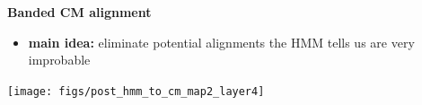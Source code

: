 \documentclass[landscape]{slides}
\begin{document}
\begin{slide}
\begin{center}
\large
\textbf{Banded CM alignment}
\end{center}
\medskip
\small
\begin{itemize}
\item
\textbf{main idea:} eliminate potential alignments the HMM tells us are very improbable
\end{itemize}
\begin{center}
\texttt{[image: figs/post\_hmm\_to\_cm\_map2\_layer4]}
\end{center}
\vfill
\end{slide}
\end{document}
